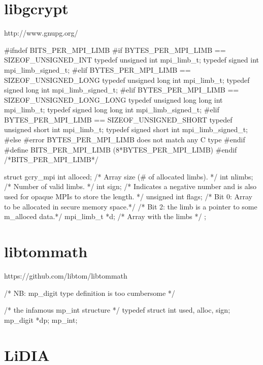\documentclass{article}
\begin{document}
\section{libgcrypt}

http://www.gnupg.org/

\begin{verbatimtab}
#ifndef BITS_PER_MPI_LIMB
#if BYTES_PER_MPI_LIMB == SIZEOF_UNSIGNED_INT
  typedef unsigned int mpi_limb_t;
  typedef   signed int mpi_limb_signed_t;
#elif BYTES_PER_MPI_LIMB == SIZEOF_UNSIGNED_LONG
  typedef unsigned long int mpi_limb_t;
  typedef   signed long int mpi_limb_signed_t;
#elif BYTES_PER_MPI_LIMB == SIZEOF_UNSIGNED_LONG_LONG
  typedef unsigned long long int mpi_limb_t;
  typedef   signed long long int mpi_limb_signed_t;
#elif BYTES_PER_MPI_LIMB == SIZEOF_UNSIGNED_SHORT
  typedef unsigned short int mpi_limb_t;
  typedef   signed short int mpi_limb_signed_t;
#else
#error BYTES_PER_MPI_LIMB does not match any C type
#endif
#define BITS_PER_MPI_LIMB    (8*BYTES_PER_MPI_LIMB)
#endif /*BITS_PER_MPI_LIMB*/

struct gcry_mpi
{
  int alloced;        /* Array size (# of allocated limbs). */
  int nlimbs;         /* Number of valid limbs. */
  int sign;           /* Indicates a negative number and is also used
                         for opaque MPIs to store the length.  */
  unsigned int flags; /* Bit 0: Array to be allocated in secure memory space.*/
                      /* Bit 2: the limb is a pointer to some m_alloced data.*/
  mpi_limb_t *d;      /* Array with the limbs */
};
\end{verbatimtab}

\section{libtommath}

https://github.com/libtom/libtommath

\begin{verbatimtab}

/* NB: mp_digit type definition is too cumbersome */

/* the infamous mp_int structure */
typedef struct {
    int used, alloc, sign;
    mp_digit *dp;
} mp_int;
\end{verbatimtab}

\section{LiDIA}
\end{document}
